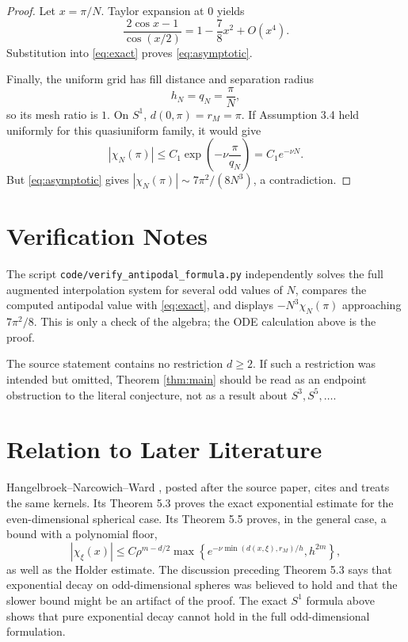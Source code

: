 \documentclass[11pt]{article}
\begin{document}
\begin{proof}
Let \(x=\pi/N\). Taylor expansion at \(0\) yields
\[
 \frac{2\cos x-1}{\cos(x/2)}
 =1-\frac78x^2+O(x^4).
\]
Substitution into \eqref{eq:exact} proves \eqref{eq:asymptotic}.

Finally, the uniform grid has fill distance and separation radius
\[
 h_N=q_N=\frac\pi N,
\]
so its mesh ratio is \(1\). On \(S^1\), \(d(0,\pi)=r_M=\pi\). If
Assumption 3.4 held uniformly for this quasiuniform family, it would give
\[
 |\chi_N(\pi)|\le C_1\exp\left(-\nu\frac\pi{q_N}\right)
 =C_1e^{-\nu N}.
\]
But \eqref{eq:asymptotic} gives
\(|\chi_N(\pi)|\sim 7\pi^2/(8N^3)\), a contradiction.
\end{proof}

\section*{Verification Notes}

The script \texttt{code/verify\_antipodal\_formula.py} independently solves
the full augmented interpolation system for several odd values of \(N\),
compares the computed antipodal value with \eqref{eq:exact}, and displays
\(-N^3\chi_N(\pi)\) approaching \(7\pi^2/8\). This is only a check of the
algebra; the ODE calculation above is the proof.

The source statement contains no restriction \(d\ge2\). If such a restriction
was intended but omitted, Theorem \ref{thm:main} should be read as an endpoint
obstruction to the literal conjecture, not as a result about
\(S^3,S^5,\ldots\).

\section*{Relation to Later Literature}

Hangelbroek--Narcowich--Ward \cite{HNWlater}, posted after the source paper,
cites \cite{HNSW} and treats the same kernels. Its Theorem 5.3 proves the exact
exponential estimate for the even-dimensional spherical case. Its Theorem 5.5
proves, in the general case, a bound with a polynomial floor,
\[
 |\chi_\xi(x)|\le C\rho^{m-d/2}
 \max\left\{e^{-\nu\min(d(x,\xi),r_M)/h},h^{2m}\right\},
\]
as well as the Holder estimate. The discussion preceding Theorem 5.3 says
that exponential decay on odd-dimensional spheres was believed to hold and
that the slower bound might be an artifact of the proof. The exact \(S^1\)
formula above shows that pure exponential decay cannot hold in the full
odd-dimensional formulation.
\end{document}
